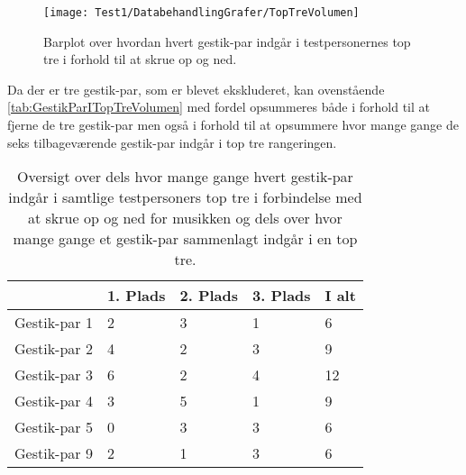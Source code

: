%
\begin{figure}[H]
	\centering
	\texttt{[image: Test1/DatabehandlingGrafer/TopTreVolumen]}
	\caption{Barplot over hvordan hvert gestik-par indgår i testpersonernes top tre i forhold til at skrue op og ned.}
	\label{fig:SamletTopTreVolumen}
\end{figure}
\noindent
%
Da der er tre gestik-par, som er blevet ekskluderet, kan ovenstående  \autoref{tab:GestikParITopTreVolumen} med fordel opsummeres både i forhold til at fjerne de tre gestik-par men også i forhold til at opsummere hvor mange gange de seks tilbageværende gestik-par indgår i top tre rangeringen. 
%
\begin{table}[H]
	\centering
	\begin{tabular}{ | p{2.4cm} | p{2.4cm} | p{2.4cm} | p{2.4cm} |p{2.4cm}|}
		\hline
		& 1. Plads & 2. Plads & 3. Plads & I alt \\ \hline
		Gestik-par 1 & 2 & 3 & 1 & 6\\ \hline
		Gestik-par 2 & 4 & 2 & 3 & 9\\ \hline
		Gestik-par 3 & 6 & 2 & 4 & 12\\ \hline
		Gestik-par 4 & 3 & 5 & 1 & 9\\ \hline 
		Gestik-par 5 & 0 & 3 & 3 & 6\\ \hline
		Gestik-par 9 & 2 & 1 & 3 & 6\\ \hline
	\end{tabular}
	\caption{Oversigt over dels hvor mange gange hvert gestik-par indgår i samtlige testpersoners top tre i forbindelse med at skrue op og ned for musikken og dels over hvor mange gange et gestik-par sammenlagt indgår i en top tre.}
	\label{tab:GestikParITopTrePauseVolumen}
\end{table}
\noindent
%
